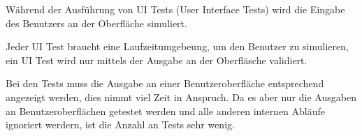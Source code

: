 Während der Ausführung von UI Tests (User Interface Tests) wird die Eingabe des Benutzers an der Oberfläche simuliert.

Jeder UI Test braucht eine Laufzeitumgebeung, um den Benutzer zu simulieren, 
ein UI Test wird nur mittels der Ausgabe an der Oberfläsche validiert. 

Bei den Tests muss die Ausgabe an einer Benutzeroberfläche entsprechend angezeigt werden, dies nimmt viel Zeit in Anspruch.
Da es aber nur die Ausgaben an Benutzeroberflächen getestet werden und alle anderen internen Abläufe ignoriert werdern, ist die Anzahl an Tests sehr wenig.
